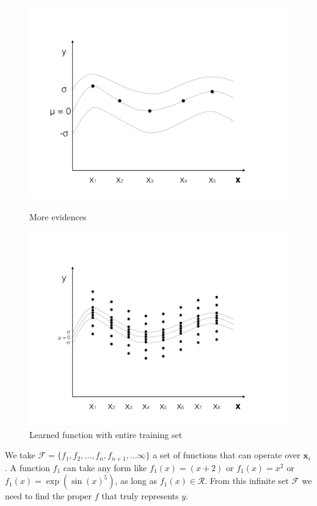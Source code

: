 \documentclass[english]{tktltiki}
\begin{document}
\begin{figure}
\begin{minipage}{.5\linewidth}
  \centering
  \includegraphics[width=\linewidth]{figures/GP_3.png}
  \caption{More evidences}
  \label{fig:sub1}
\end{minipage}%
\begin{minipage}{.5\linewidth}
  \centering
  \includegraphics[width=\linewidth]{figures/GP_4.png}
  \caption{Learned function with entire training set}
  \label{fig:sub2}
\end{minipage}

\label{fig:test}
\end{figure}

We take $\mathcal{F} = \{f_1, f_2, ..., f_n, f_{n+1}, ... \infty\}$ a set of functions that can operate over $\mathbf{x}_i$. A function $f_1$ can take any form like $f_1(x) = (x + 2)$ or $f_1(x) = x^2$ or $f_1(x) = \exp(\sin(x)^5)$, as long as $f_1(x) \in \mathcal{R}$. From this infinite set $\mathcal{F}$ we need to find the proper $f$ that truly represents $y$.
\end{document}
